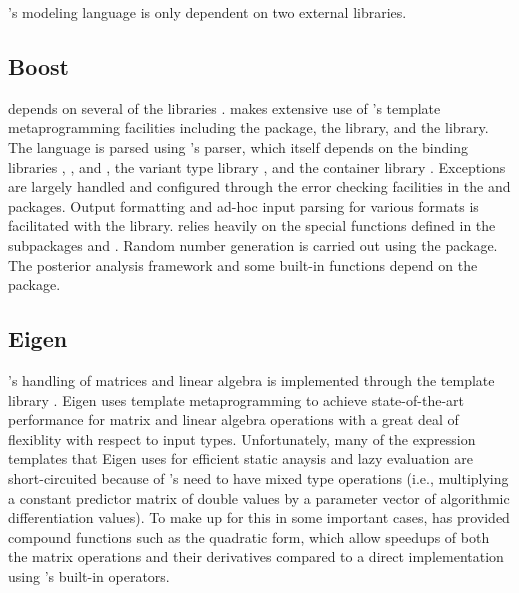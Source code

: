 \documentclass[article]{jss}
\begin{document}
's modeling language is only dependent on two external
libraries.  

\subsection{Boost} 

 depends on several of the  
libraries \citep{Boost:2011}.   makes extensive use of
's template metaprogramming facilities including the
 package, the  library, and the
 library.  The  language is parsed
using 's  parser, which itself depends on
the binding libraries , , and ,
the variant type library , and the container library
.  Exceptions are largely handled and configured through
the error checking facilities in the  and
 packages.  Output formatting and ad-hoc input parsing
for various formats is facilitated with the  library.
 relies heavily on the special functions defined in the
 subpackages  and .  Random number generation is carried out using the
 package.  The posterior analysis framework and some
built-in functions depend on the  package.

\subsection{Eigen}

's handling of matrices and linear algebra is
implemented through the   template library
\citep{Eigen:2012}.  Eigen uses template metaprogramming to achieve
state-of-the-art performance for matrix and linear algebra operations
with a great deal of flexiblity with respect to input types.
Unfortunately, many of the expression templates that Eigen uses for
efficient static anaysis and lazy evaluation are short-circuited
because of 's need to have mixed type operations (i.e.,
multiplying a constant predictor matrix of double values by a
parameter vector of algorithmic differentiation values).  To make up for
this in some important cases,  has provided compound
functions such as the quadratic form, which allow speedups of both the
matrix operations and their derivatives compared to a direct
implementation using 's built-in operators.
\end{document}
